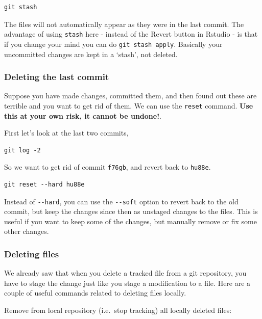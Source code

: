 \documentclass[]{book}
\begin{document}
\begin{verbatim}
git stash
\end{verbatim}

The files will not automatically appear as they were in the last commit. The advantage of using \texttt{stash} here - instead of the Revert button in Rstudio - is that if you change your mind you can do \texttt{git\ stash\ apply}. Basically your uncommitted changes are kept in a `stash', not deleted.

\hypertarget{deleting-the-last-commit}{%
\subsubsection{Deleting the last commit}\label{deleting-the-last-commit}}

Suppose you have made changes, committed them, and then found out these are terrible and you want to get rid of them. We can use the \texttt{reset} command. \textbf{Use this at your own risk, it cannot be undone!}.

First let's look at the last two commits,

\begin{verbatim}
git log -2
\end{verbatim}

So we want to get rid of commit \texttt{f76gb}, and revert back to \texttt{hu88e}.

\begin{verbatim}
git reset --hard hu88e
\end{verbatim}

Instead of \texttt{-\/-hard}, you can use the \texttt{-\/-soft} option to revert back to the old commit, but keep the changes since then as unstaged changes to the files. This is useful if you want to keep some of the changes, but manually remove or fix some other changes.

\hypertarget{deleting-files}{%
\subsubsection{Deleting files}\label{deleting-files}}

We already saw that when you delete a tracked file from a git repository, you have to stage the change just like you stage a modification to a file. Here are a couple of useful commands related to deleting files locally.

Remove from local repository (i.e.~stop tracking) all locally deleted files:
\end{document}
